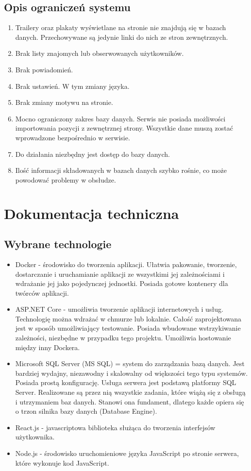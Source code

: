 \documentclass[12pt]{article}
\begin{document}
\begin{flushleft}
		\subsection{Opis ograniczeń systemu}
			\begin{enumerate}
				\item Trailery oraz plakaty wyświetlane na stronie nie znajdują się w bazach danych. Przechowywane są jedynie linki do nich ze stron zewnętrznych.
				\item Brak listy znajomych lub obserwowanych użytkowników.
				\item Brak powiadomień.
				\item Brak ustawień. W tym zmiany języka.
				\item Brak zmiany motywu na stronie.
				\item Mocno ograniczony zakres bazy danych. Serwis nie posiada możliwości importowania pozycji z zewnętrznej strony. Wszystkie dane muszą zostać wprowadzone bezpośrednio w serwisie.					\item Do działania niezbędny jest dostęp do bazy danych.
				\item Ilość informacji składowanych w bazach danych szybko rośnie, co może powodować problemy w obsłudze.
			\end{enumerate}
					
		
\pagebreak
	\section{Dokumentacja techniczna}
		\subsection{Wybrane technologie}
		\begin{itemize}
			\item Docker -  środowisko do tworzenia aplikacji. Ułatwia pakowanie, tworzenie, dostarczanie i uruchamianie aplikacji ze wszystkimi jej zależnościami i wdrażanie jej jako pojedynczej jednostki. Posiada gotowe kontenery dla twórców aplikacji.
			\item ASP.NET Core - umożliwia tworzenie aplikacji internetowych i usług. Technologię można wdrażać w chmurze lub lokalnie. Całość zaprojektowana jest w sposób umożliwiający testowanie. Posiada wbudowane wstrzykiwanie zależności, niezbędne w przypadku tego projektu. Umożliwia hostowanie między inny Dockera.
			\item Microsoft SQL Server (MS SQL) = system do zarządzania bazą danych. Jest bardziej wydajny, niezawodny i skalowalny od większości tego typu systemów. Posiada prostą konfigurację. Usługa serwera jest podstawą platformy SQL Server. Realizowane są przez nią wszystkie zadania, które wiążą się z obsługą i utrzymaniem baz danych. Stanowi ona fundament, dlatego każde opiera się o trzon silnika bazy danych (Database Engine).
			\item React.js - javascriptowa biblioteka służąca do tworzenia interfejsów użytkownika. 
			\item Node.js - środowisko uruchomieniowe języka JavaScript po stronie serwera, które wykonuje kod JavaScript.
		\end{itemize}

\end{flushleft}
\end{document}
